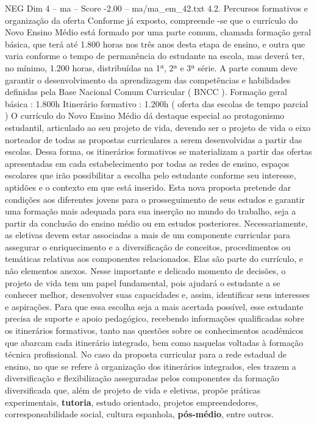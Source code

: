 \begin{textsample}{NEG Dim 4 – ma – Score -2.00 – ma/ma\_em\_42.txt}  \label{ex:f4_neg_238}
4.2.
Percursos formativos e organização da oferta Conforme já exposto, compreende -se que o currículo do Novo Ensino Médio está formado por uma parte comum, chamada formação geral básica, que terá até 1.800 horas nos três anos desta etapa de ensino, e outra que varia conforme o tempo de permanência do estudante na escola, mas deverá ter, no mínimo, 1.200 horas, distribuídas na 1ª, 2ª e 3ª série.
A parte comum deve garantir o desenvolvimento da aprendizagem das competências e habilidades definidas pela Base Nacional Comum Curricular ( BNCC ).
Formação geral básica : 1.800h Itinerário formativo : 1.200h ( oferta das escolas de tempo parcial ) O currículo do Novo Ensino Médio dá destaque especial ao protagonismo estudantil, articulado ao seu projeto de vida, devendo ser o projeto de vida o eixo norteador de todas as propostas curriculares a serem desenvolvidas a partir das escolas.
Dessa forma, os itinerários formativos se materializam a partir das ofertas apresentadas em cada estabelecimento por todas as redes de ensino, espaços escolares que irão possibilitar a escolha pelo estudante conforme seu interesse, aptidões e o contexto em que está inserido.
Esta nova proposta pretende dar condições aos diferentes jovens para o prosseguimento de seus estudos e garantir uma formação mais adequada para sua inserção no mundo do trabalho, seja a partir da conclusão do ensino médio ou em estudos posteriores.
Necessariamente, as eletivas devem estar associadas a mais de um componente curricular para assegurar o enriquecimento e a diversificação de conceitos, procedimentos ou temáticas relativas aos componentes relacionados.
Elas são parte do currículo, e não elementos anexos.
Nesse importante e delicado momento de decisões, o projeto de vida tem um papel fundamental, pois ajudará o estudante a se conhecer melhor, desenvolver suas capacidades e, assim, identificar seus interesses e aspirações.
Para que essa escolha seja a mais acertada possível, esse estudante precisa de suporte e apoio pedagógico, recebendo informações qualificadas sobre os itinerários formativos, tanto nas questões sobre os conhecimentos acadêmicos que abarcam cada itinerário integrado, bem como naquelas voltadas à formação técnica profissional.
No caso da proposta curricular para a rede estadual de ensino, no que se refere à organização dos itinerários integrados, eles trazem a diversificação e flexibilização asseguradas pelos componentes da formação diversificada que, além de projeto de vida e eletivas, propõe práticas experimentais, \textbf{tutoria}, estudo orientado, projetos empreendedores, corresponsabilidade social, cultura espanhola, \textbf{pós-médio}, entre outros.

\end{textsample}
